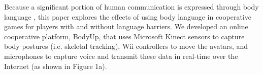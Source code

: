 %
%

Because a significant portion of human communication is expressed through body language \cite{GD2}, this paper explores the effects of using body language in cooperative games for players with and without language barriers. We developed an online cooperative platform, BodyUp, that uses Microsoft Kinect sensors to capture body postures (i.e. skeletal tracking), Wii controllers to move the avatars, and microphones to capture voice and transmit these data in real-time over the Internet (as shown in Figure 1a). 

